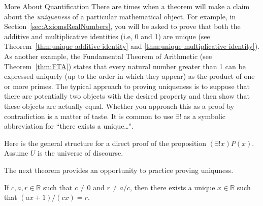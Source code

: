 \begin{section}{More About Quantification}
There are times when a theorem will make a claim about the \emph{uniqueness} of a particular mathematical object.  For example, in Section~\ref{sec:AxiomsRealNumbers}, you will be asked to prove that both the additive and multiplicative identities (i.e, 0 and 1) are unique (see Theorem~\ref{thm:unique additive identity} and \ref{thm:unique multiplicative identity}). As another example, the Fundamental Theorem of Arithmetic (see Theorem~\ref{thm:FTA}) states that every natural number greater than 1 can be expressed uniquely (up to the order in which they appear) as the product of one or more primes. The typical approach to proving uniqueness is to suppose that there are potentially two objects with the desired property and then show that these objects are actually equal. Whether you approach this as a proof by contradiction is a matter of taste. It is common to use $\boxed{\exists!}$ as a symbolic abbreviation for ``there exists a unique\ldots".

\begin{skeleton}\label{skeleton:uniqueness}
Here is the general structure for a direct proof of the proposition $(\exists! x)P(x)$. Assume $U$ is the universe of discourse.

\begin{center}
\end{center}
\end{skeleton}

The next theorem provides an opportunity to practice proving uniquness.

\begin{theorem}
If $c,a,r\in\mathbb{R}$ such that $c\neq 0$ and $r\neq a/c$, then there exists a unique $x\in\mathbb{R}$ such that $(ax+1)/(cx)=r$.
\end{theorem}

\end{section}